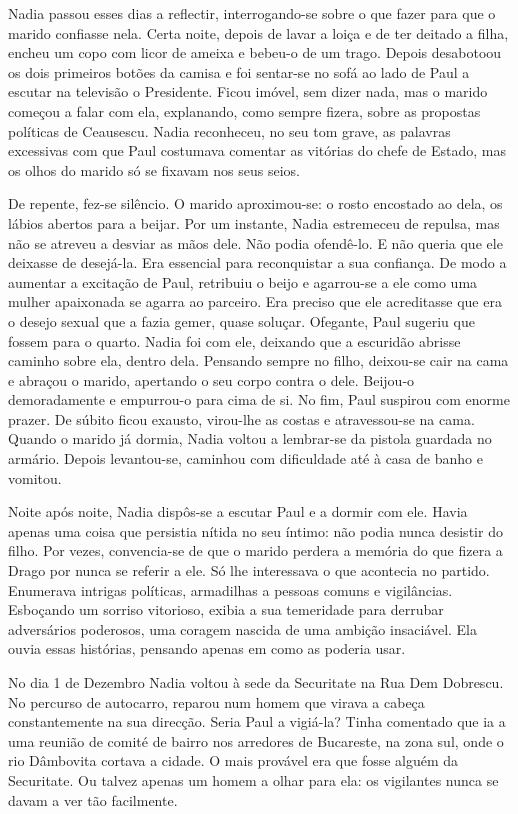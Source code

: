 Nadia passou esses dias a reflectir, interrogando-se sobre o que fazer
para que o marido confiasse nela. Certa noite, depois de lavar a loiça e
de ter deitado a filha, encheu um copo com licor de ameixa e bebeu-o de
um trago. Depois desabotoou os dois primeiros botões da camisa e foi
sentar-se no sofá ao lado de Paul a escutar na
televisão o Presidente. Ficou imóvel, sem dizer nada, mas o marido
começou a falar com ela, explanando, como sempre fizera, sobre as
propostas políticas de Ceausescu. Nadia reconheceu, no seu tom grave, as
palavras excessivas com que Paul costumava comentar as vitórias do
chefe de Estado, mas os olhos do marido só se fixavam nos seus seios.

De repente, fez-se silêncio. O marido aproximou-se: o rosto encostado ao
dela, os lábios abertos para a beijar. Por um instante, Nadia estremeceu
de repulsa, mas não se atreveu a desviar as mãos dele. Não podia
ofendê-lo. E não queria que ele deixasse de desejá-la. Era essencial
para reconquistar a sua confiança. De modo a aumentar a excitação de
Paul, retribuiu o beijo e agarrou-se a ele como uma mulher apaixonada se
agarra ao parceiro. Era preciso que ele acreditasse que era o desejo
sexual que a fazia gemer, quase soluçar. Ofegante, Paul sugeriu que
fossem para o quarto. Nadia foi com ele, deixando que a escuridão
abrisse caminho sobre ela, dentro dela. Pensando sempre no filho,
deixou-se cair na cama e abraçou o marido, apertando o seu corpo contra
o dele. Beijou-o demoradamente e empurrou-o para cima de si. No fim,
Paul suspirou com enorme prazer. De súbito ficou exausto, virou-lhe as
costas e atravessou-se na cama. Quando o marido já dormia, Nadia voltou
a lembrar-se da pistola guardada no armário. Depois levantou-se,
caminhou com dificuldade até à casa de banho e vomitou.

Noite após noite, Nadia dispôs-se a escutar Paul e a
dormir com ele. Havia apenas uma coisa que persistia nítida no seu
íntimo: não podia nunca desistir do filho. Por
vezes, convencia-se de que o marido perdera a memória do que fizera a
Drago por nunca se referir a ele. Só lhe interessava o que acontecia
no partido. Enumerava intrigas políticas, armadilhas a pessoas comuns e
vigilâncias. Esboçando um sorriso vitorioso, exibia a sua temeridade
para derrubar adversários poderosos, uma coragem nascida de uma ambição
insaciável. Ela ouvia essas histórias, pensando apenas em como as
poderia usar.

No dia 1 de Dezembro Nadia voltou à sede da Securitate na Rua Dem
Dobrescu. No percurso de autocarro, reparou num homem que virava a
cabeça constantemente na sua direcção. Seria Paul a vigiá-la? Tinha
comentado que ia a uma reunião de comité de bairro nos arredores de
Bucareste, na zona sul, onde o rio Dâmbovita cortava a cidade. O mais
provável era que fosse alguém da Securitate. Ou talvez apenas um homem
a olhar para ela: os vigilantes nunca se davam a ver tão facilmente.

